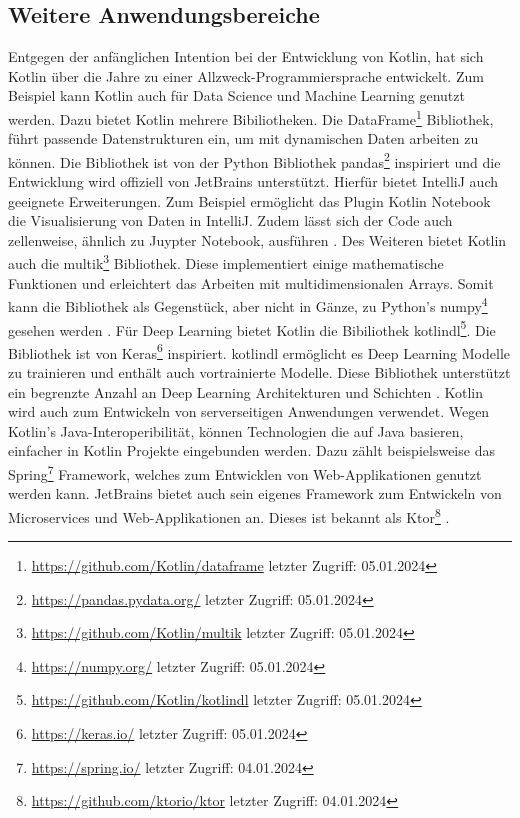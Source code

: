 \documentclass{article}
\begin{document}
\subsection{Weitere Anwendungsbereiche}
Entgegen der anfänglichen Intention bei der Entwicklung von Kotlin, hat sich Kotlin über die Jahre zu einer Allzweck-Programmiersprache entwickelt. Zum Beispiel kann Kotlin auch für Data Science und Machine Learning genutzt werden. Dazu bietet Kotlin mehrere Bibiliotheken. Die DataFrame\footnote{\url{https://github.com/Kotlin/dataframe} letzter Zugriff: 05.01.2024} Bibliothek, führt passende Datenstrukturen ein, um mit dynamischen Daten arbeiten zu können. Die Bibliothek ist von der Python Bibliothek pandas\footnote{\url{https://pandas.pydata.org/} letzter Zugriff: 05.01.2024} inspiriert und die Entwicklung wird offiziell von JetBrains unterstützt. Hierfür bietet IntelliJ auch geeignete Erweiterungen. Zum Beispiel ermöglicht das Plugin Kotlin Notebook die Visualisierung von Daten in IntelliJ. Zudem lässt sich der Code auch zellenweise, ähnlich zu Juypter Notebook, ausführen \cite{KotlinLangDocData}. \newline
Des Weiteren bietet Kotlin auch die multik\footnote{\url{https://github.com/Kotlin/multik} letzter Zugriff: 05.01.2024} Bibliothek. Diese implementiert einige mathematische Funktionen und erleichtert das Arbeiten mit multidimensionalen Arrays. Somit kann die Bibliothek als Gegenstück, aber nicht in Gänze, zu Python's numpy\footnote{\url{https://numpy.org/} letzter Zugriff: 05.01.2024} gesehen werden \cite{KotlinLangDocData}. \newline
Für Deep Learning bietet Kotlin die Bibiliothek kotlindl\footnote{\url{https://github.com/Kotlin/kotlindl} letzter Zugriff: 05.01.2024}. Die Bibliothek ist von Keras\footnote{\url{https://keras.io/} letzter Zugriff: 05.01.2024} inspiriert. kotlindl ermöglicht es Deep Learning Modelle zu trainieren und enthält auch vortrainierte Modelle. Diese Bibliothek unterstützt ein begrenzte Anzahl an Deep Learning Architekturen und Schichten \cite{KotlinLangDocData}. \newline
Kotlin wird auch zum Entwickeln von serverseitigen Anwendungen verwendet. Wegen Kotlin's Java-Interoperibilität, können Technologien die auf Java basieren, einfacher in Kotlin Projekte eingebunden werden. Dazu zählt beispielsweise das Spring\footnote{\url{https://spring.io/} letzter Zugriff: 04.01.2024} Framework, welches zum Entwicklen von Web-Applikationen genutzt werden kann. JetBrains bietet auch sein eigenes Framework zum Entwickeln von Microservices und Web-Applikationen an. Dieses ist bekannt als Ktor\footnote{\url{https://github.com/ktorio/ktor} letzter Zugriff: 04.01.2024} \cite{KotlinLangDocServer}.
\end{document}
